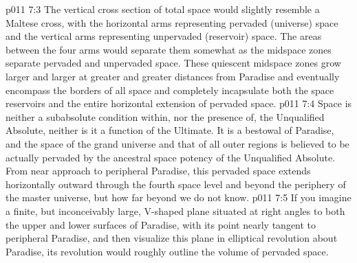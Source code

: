 \vs p011 7:3 The vertical cross section of total space would slightly resemble a Maltese cross, with the horizontal arms representing pervaded (universe) space and the vertical arms representing unpervaded (reservoir) space. The areas between the four arms would separate them somewhat as the midspace zones separate pervaded and unpervaded space. These quiescent midspace zones grow larger and larger at greater and greater distances from Paradise and eventually encompass the borders of all space and completely incapsulate both the space reservoirs and the entire horizontal extension of pervaded space.
\vs p011 7:4 \pc Space is neither a subabsolute condition within, nor the presence of, the Unqualified Absolute, neither is it a function of the Ultimate. It is a bestowal of Paradise, and the space of the grand universe and that of all outer regions is believed to be actually pervaded by the ancestral space potency of the Unqualified Absolute. From near approach to peripheral Paradise, this pervaded space extends horizontally outward through the fourth space level and beyond the periphery of the master universe, but how far beyond we do not know.
\vs p011 7:5 If you imagine a finite, but inconceivably large, V\hyp{}shaped plane situated at right angles to both the upper and lower surfaces of Paradise, with its point nearly tangent to peripheral Paradise, and then visualize this plane in elliptical revolution about Paradise, its revolution would roughly outline the volume of pervaded space.
